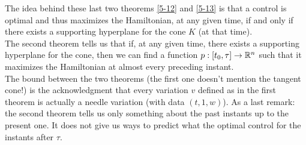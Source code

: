 The idea behind these last two theorems \ref{5-12} and \ref{5-13} is that  a control is optimal and thus maximizes the Hamiltonian, at any given time, if and only if there exists a supporting hyperplane for the cone $K$ (at that time).\\
The second theorem tells us that if, at any given time, there exists a supporting hyperplane for the cone, then we can find a function $p:[t_0,\tau]\rightarrow\mathbb{R}^n$ such that it maximizes the Hamiltonian at almost every preceding instant.\\
The bound between the two theorems (the first one doesn't mention the tangent cone!) is the acknowledgment that every variation $v$ defined  as in the first theorem is actually a needle variation (with data $(t,1,w)$).
As a last remark: the second theorem tells us only something about the past instants up to the present one. It does not give us ways to predict what the optimal control for the instants after $\tau$.\\

